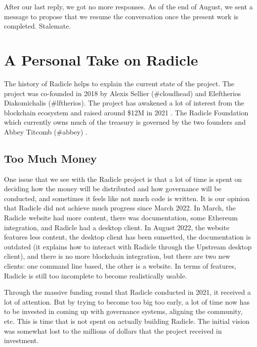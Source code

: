 After our last reply, we got no more responses.
As of the end of August, we sent a message to propose that we resume the conversation once the present work is completed.
Stalemate.

\section{A Personal Take on Radicle}

The history of Radicle helps to explain the current state of the project.
The project was co-founded in 2018 by Alexis Sellier (\#cloudhead) and Eleftherios Diakomichalis (\#lftherios).
The project has awakened a lot of interest from the blockchain ecosystem and raised around \$12M in 2021 \cite{noauthor_radicle_nodate}%
.
The Radicle Foundation which currently owns much of the treasury is governed by the two founders and Abbey Titcomb (\#abbey) \cite{noauthor_formal_nodate}.

\subsection{Too Much Money}

One issue that we see with the Radicle project is that a lot of time is spent on deciding how the money will be distributed and how governance will be conducted, and sometimes it feels like not much code is written.
It is our opinion that Radicle did not achieve much progress since March 2022.
In March, the Radicle website had more content, there was documentation, some Ethereum integration, and Radicle had a desktop client.
In August 2022, the website features less content, the desktop client has been sunsetted, the documentation is outdated (it explains how to interact with Radicle through the Upstream desktop client), and there is no more blockchain integration, but there are two new clients: one command line based, the other is a website.
In terms of features, Radicle is still too incomplete to become realistically usable.

Through the massive funding round that Radicle conducted in 2021, it received a lot of attention.
But by trying to become too big too early, a lot of time now has to be invested in coming up with governance systems, aligning the community, etc.
This is time that is not spent on actually building Radicle.
The initial vision was somewhat lost to the millions of dollars that the project received in investment.

